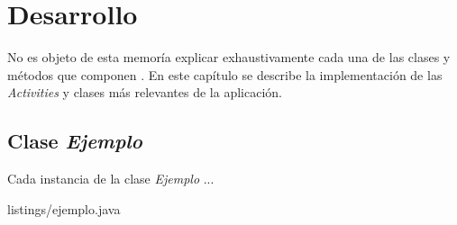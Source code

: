 %
%
%
%
\chapter{Desarrollo} \label{chap:Desarrollo}  

No es objeto de esta memoría explicar exhaustivamente cada una de las clases y métodos que componen \App{}.
En este capítulo se describe la implementación de las \textit{Activities} y clases más relevantes de la aplicación. 

\section{Clase \textit{Ejemplo}}

Cada instancia de la clase \textit{Ejemplo} ...


{listings/ejemplo.java} %
